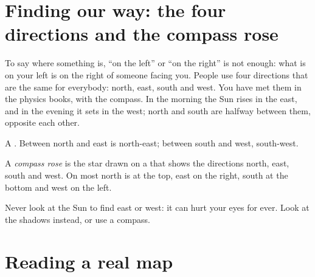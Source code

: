 \section{Finding our way: the four directions and the compass rose}

To say where something is, ``on the left'' or ``on the right'' is not
enough: what is on your left is on the right of someone facing you. People
use four directions that are the same for everybody: north, east, south and
west. You have met them in the physics books, with the compass. In the
morning the Sun rises in the east, and in the evening it sets in the west;
north and south are halfway between them, opposite each other.

\begin{omfigure}

{\small A . Between north and east is north-east; between
south and west, south-west.}
\label{fig:g2:drawing-to-map:rose}
\end{omfigure}

\begin{definition}\label{def:g2:drawing-to-map:directions}
A \emph{compass rose} is the star drawn on a  that
shows the directions north, east, south and west. On most  north is at
the top, east on the right, south at the bottom and west on the left.
\end{definition}

\begin{safety}
Never look at the Sun to find east or west: it can hurt your eyes for ever.
Look at the shadows instead, or use a compass.
\end{safety}

\section{Reading a real map}


